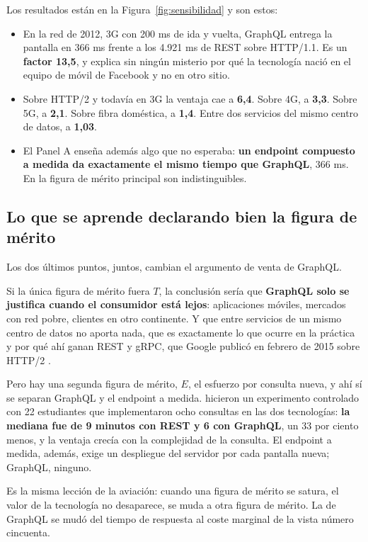 \documentclass[11pt,letterpaper]{article}
\begin{document}
Los resultados están en la Figura~\ref{fig:sensibilidad} y son estos:

\begin{itemize}
\item En la red de 2012, 3G con 200 ms de ida y vuelta, GraphQL entrega la
  pantalla en 366 ms frente a los 4.921 ms de REST sobre HTTP/1.1. Es un
  \textbf{factor 13,5}, y explica sin ningún misterio por qué la tecnología
  nació en el equipo de móvil de Facebook y no en otro sitio.
\item Sobre HTTP/2 y todavía en 3G la ventaja cae a \textbf{6,4}. Sobre 4G, a
  \textbf{3,3}. Sobre 5G, a \textbf{2,1}. Sobre fibra doméstica, a
  \textbf{1,4}. Entre dos servicios del mismo centro de datos, a
  \textbf{1,03}.
\item El Panel A enseña además algo que no esperaba: \textbf{un endpoint
  compuesto a medida da exactamente el mismo tiempo que GraphQL}, 366 ms. En la
  figura de mérito principal son indistinguibles.
\end{itemize}

\subsection*{Lo que se aprende declarando bien la figura de mérito}

Los dos últimos puntos, juntos, cambian el argumento de venta de GraphQL.

Si la única figura de mérito fuera $T$, la conclusión sería que \textbf{GraphQL
solo se justifica cuando el consumidor está lejos}: aplicaciones móviles,
mercados con red pobre, clientes en otro continente. Y que entre servicios de
un mismo centro de datos no aporta nada, que es exactamente lo que ocurre en la
práctica y por qué ahí ganan REST y gRPC, que Google publicó en febrero de 2015
sobre HTTP/2 \parencite{grpc2015}.

Pero hay una segunda figura de mérito, $E$, el esfuerzo por consulta nueva, y
ahí sí se separan GraphQL y el endpoint a medida. \textcite{brito2020} hicieron
un experimento controlado con 22 estudiantes que implementaron ocho consultas
en las dos tecnologías: \textbf{la mediana fue de 9 minutos con REST y 6 con
GraphQL}, un 33 por ciento menos, y la ventaja crecía con la complejidad de la
consulta. El endpoint a medida, además, exige un despliegue del servidor por
cada pantalla nueva; GraphQL, ninguno.

Es la misma lección de la aviación: cuando una figura de mérito se satura, el
valor de la tecnología no desaparece, se muda a otra figura de mérito. La de
GraphQL se mudó del tiempo de respuesta al coste marginal de la vista número
cincuenta.
\end{document}
